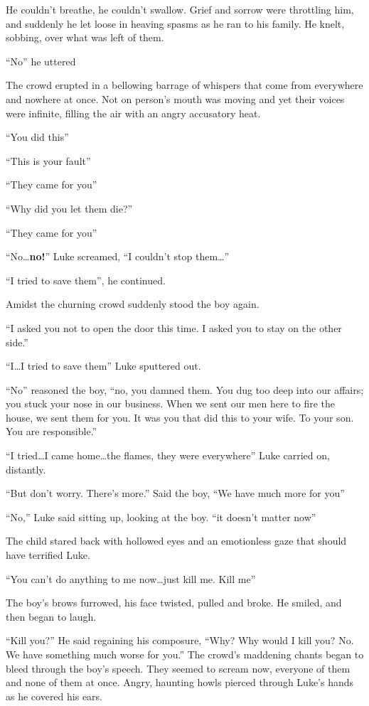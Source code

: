 He couldn't breathe, he couldn't swallow. Grief and sorrow were
throttling him, and suddenly he let loose in heaving spasms as he ran to
his family. He knelt, sobbing, over what was left of them.

``No'' he uttered

The crowd erupted in a bellowing barrage of whispers that come from
everywhere and nowhere at once. Not on person's mouth was moving and
yet their voices were infinite, filling the air with an angry accusatory
heat.

``You did this''

``This is your fault''

``They came for you''

``Why did you let them die?''

``They came for you''

``No\ldots {\bf no!}'' Luke screamed, ``I couldn't stop them\ldots{}''

``I tried to save them'', he continued.

Amidst the churning crowd suddenly stood the boy again.

``I asked you not to open the door this time. I asked you to stay on the
other side.''

``I\ldots I tried to save them'' Luke sputtered out.

``No'' reasoned the boy, ``no, you damned them. You dug too deep into
our affairs; you stuck your nose in our business. When we sent our men
here to fire the house, we sent them for you. It was you that did this
to your wife. To your son. You are responsible.''

``I tried\ldots I came home\ldots the flames, they were everywhere'' Luke carried
on, distantly.

``But don't worry. There's more.'' Said the boy, ``We have much more
for you''

``No,'' Luke said sitting up, looking at the boy. ``it doesn't matter
now''

The child stared back with hollowed eyes and an emotionless gaze that
should have terrified Luke.

``You can't do anything to me now\ldots just kill me. Kill me''

The boy's brows furrowed, his face twisted, pulled and broke. He
smiled, and then began to laugh.

``Kill you?'' He said regaining his composure, ``Why? Why would I kill
you? No. We have something much worse for you.'' The crowd's maddening
chants began to bleed through the boy's speech. They seemed to scream
now, everyone of them and none of them at once. Angry, haunting howls
pierced through Luke's hands as he covered his ears.

